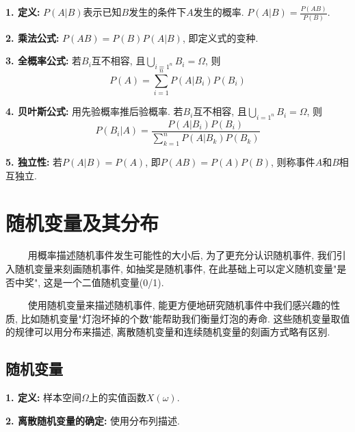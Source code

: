 \textbf{1. 定义: }$P(A|B)$表示已知$B$发生的条件下$A$发生的概率. $P(A|B)=\frac{P(AB)}{P(B)}$.

\textbf{2. 乘法公式: }$P(AB)=P(B)P(A|B)$, 即定义式的变种.

\textbf{3. 全概率公式: }若$B_i$互不相容, 且$\bigcup\limits_{i=1^n}B_i=\Omega$, 则
\begin{equation*}
    P(A)=\sum\limits_{i=1}^n P(A|B_i)P(B_i)
\end{equation*}

\textbf{4. 贝叶斯公式: }用先验概率推后验概率.  若$B_i$互不相容, 且$\bigcup\limits_{i=1^n}B_i=\Omega$, 则
\begin{equation*}
    P(B_i|A)=\frac{P(A|B_i)P(B_i)}{\sum\limits_{k=1}^n P(A|B_k)P(B_k)}
\end{equation*}

\textbf{5. 独立性: }若$P(A|B)=P(A)$, 即$P(AB)=P(A)P(B)$, 则称事件$A$和$B$相互独立.

\section{随机变量及其分布}

\begin{tcolorbox}[colback=red!5,colframe=red!75!black]
    ~~~~ 用概率描述随机事件发生可能性的大小后, 为了更充分认识随机事件, 我们引入随机变量来刻画随机事件, 如抽奖是随机事件, 在此基础上可以定义随机变量"是否中奖", 这是一个二值随机变量(0/1). 

    ~~~~ 使用随机变量来描述随机事件, 能更方便地研究随机事件中我们感兴趣的性质, 比如随机变量"灯泡坏掉的个数"能帮助我们衡量灯泡的寿命. 这些随机变量取值的规律可以用分布来描述, 离散随机变量和连续随机变量的刻画方式略有区别.

\end{tcolorbox}

\subsection{随机变量}

\textbf{1. 定义: }样本空间$\Omega$上的实值函数$X(\omega)$. 

\textbf{2. 离散随机变量的确定: }使用分布列描述.

\begin{table}[H]
    \centering
\end{table}

